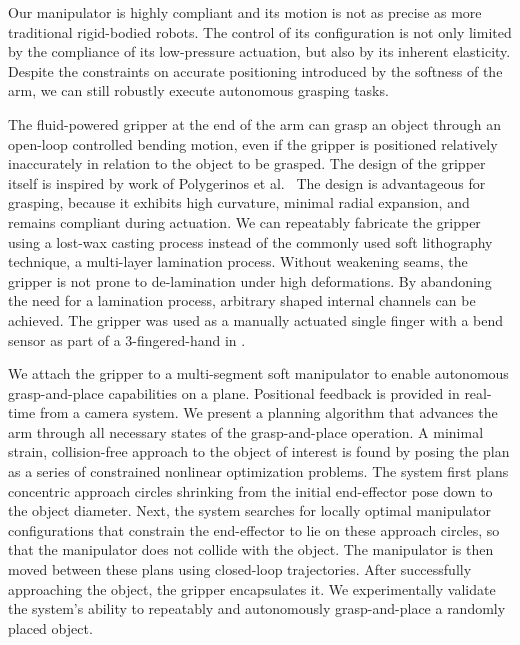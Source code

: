 Our manipulator is highly compliant and its motion is not as precise as more traditional rigid-bodied robots. 
The control of its configuration is not only limited by the compliance of its low-pressure actuation, but also by its inherent elasticity.
Despite the constraints on accurate positioning introduced by the softness of the arm, we can still robustly execute autonomous grasping tasks.


The fluid-powered gripper at the end of the arm can grasp an object through an open-loop controlled bending motion, even if the gripper is positioned relatively inaccurately in relation to the object to be grasped.
The design of the gripper itself is inspired by work of Polygerinos et al.~\cite{polygerinos2013towards}
The design is advantageous for grasping, because it exhibits high curvature, minimal radial expansion, and remains compliant during actuation. 
We can repeatably fabricate the gripper using a lost-wax casting process instead of the commonly used soft lithography technique, a multi-layer lamination process.
Without weakening seams, the gripper is not prone to de-lamination under high deformations. 
By abandoning the need for a lamination process, arbitrary shaped internal channels can be achieved. 
The gripper was used as a manually actuated single finger with a bend sensor as part of a 3-fingered-hand in \cite{homberg2015haptic}.

We attach the gripper to a multi-segment soft manipulator to enable autonomous grasp-and-place capabilities on a plane. 
Positional feedback is provided in real-time from a camera system.
We present a planning algorithm that advances the arm through all necessary states of the grasp-and-place operation.
A minimal strain, collision-free approach to the object of interest is found by posing the plan as a series of constrained nonlinear optimization problems.
The system first plans concentric approach circles shrinking from the initial end-effector pose down to the object diameter.
Next, the system searches for locally optimal manipulator configurations that constrain the end-effector to lie on these approach circles, so that the manipulator does not collide with the object. 
The manipulator is then moved between these plans using closed-loop trajectories. 
After successfully approaching the object, the gripper encapsulates it.
We experimentally validate the system's ability to repeatably and autonomously grasp-and-place a randomly placed object.

